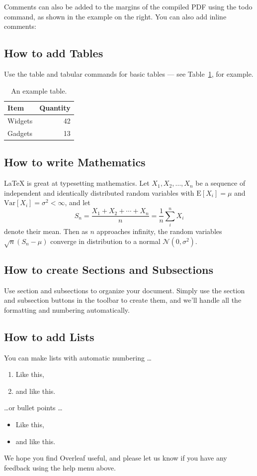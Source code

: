 \documentclass[a4paper]{article}
\begin{document}
Comments can also be added to the margins of the compiled PDF using the todo command,  as shown in the example on the right. You can also add inline comments:


\subsection{How to add Tables}

Use the table and tabular commands for basic tables --- see Table~\ref{tab:widgets}, for example. 

\begin{table}
\centering
\begin{tabular}{l|r}
Item & Quantity \\\hline
Widgets & 42 \\
Gadgets & 13
\end{tabular}
\caption{\label{tab:widgets}An example table.}
\end{table}

\subsection{How to write Mathematics}

\LaTeX{} is great at typesetting mathematics. Let $X_1, X_2, \ldots, X_n$ be a sequence of independent and identically distributed random variables with $\text{E}[X_i] = \mu$ and $\text{Var}[X_i] = \sigma^2 < \infty$, and let
\[S_n = \frac{X_1 + X_2 + \cdots + X_n}{n}
      = \frac{1}{n}\sum_{i}^{n} X_i\]
denote their mean. Then as $n$ approaches infinity, the random variables $\sqrt{n}(S_n - \mu)$ converge in distribution to a normal $\mathcal{N}(0, \sigma^2)$.


\subsection{How to create Sections and Subsections}

Use section and subsections to organize your document. Simply use the section and subsection buttons in the toolbar to create them, and we'll handle all the formatting and numbering automatically.

\subsection{How to add Lists}

You can make lists with automatic numbering \dots

\begin{enumerate}
\item Like this,
\item and like this.
\end{enumerate}
\dots or bullet points \dots
\begin{itemize}
\item Like this,
\item and like this.
\end{itemize}

We hope you find Overleaf useful, and please let us know if you have any feedback using the help menu above.
\end{document}
